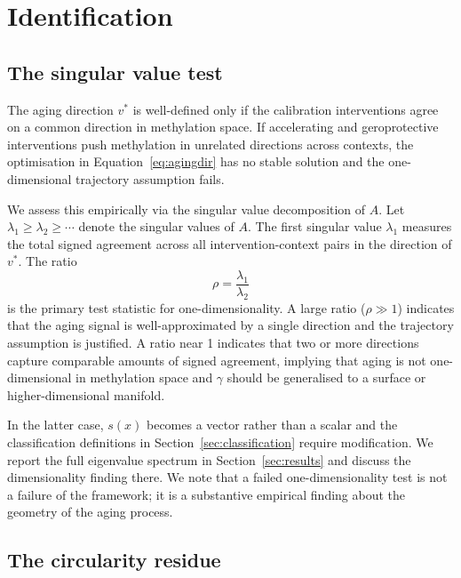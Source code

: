 \section{Identification}
\label{sec:identification}

\subsection{The singular value test}
\label{sec:svdtest}

The aging direction $v^*$ is well-defined only if the calibration interventions
agree on a common direction in methylation space. If accelerating and geroprotective
interventions push methylation in unrelated directions across contexts, the
optimisation in Equation~\eqref{eq:agingdir} has no stable solution and the
one-dimensional trajectory assumption fails.

We assess this empirically via the singular value decomposition of $A$. Let
$\lambda_1 \geq \lambda_2 \geq \cdots$ denote the singular values of $A$. The
first singular value $\lambda_1$ measures the total signed agreement across all
intervention-context pairs in the direction of $v^*$. The ratio
\begin{equation}
  \rho = \frac{\lambda_1}{\lambda_2}
  \label{eq:svdratio}
\end{equation}
is the primary test statistic for one-dimensionality. A large ratio ($\rho \gg 1$)
indicates that the aging signal is well-approximated by a single direction and the
trajectory assumption is justified. A ratio near 1 indicates that two or more
directions capture comparable amounts of signed agreement, implying that aging is
not one-dimensional in methylation space and $\gamma$ should be generalised to a
surface or higher-dimensional manifold.

In the latter case, $s(x)$ becomes a vector rather than a scalar and the
classification definitions in Section~\ref{sec:classification} require modification.
We report the full eigenvalue spectrum in Section~\ref{sec:results} and discuss the
dimensionality finding there. We note that a failed one-dimensionality test is not
a failure of the framework; it is a substantive empirical finding about the geometry
of the aging process.

\subsection{The circularity residue}
\label{sec:circularity}

